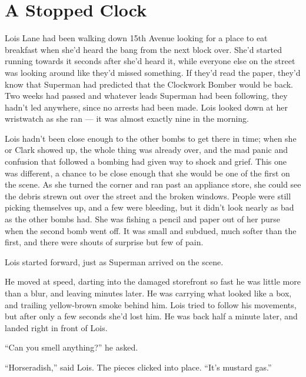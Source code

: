 \chapter{A Stopped Clock}\label{a-stopped-clock}

Lois Lane had been walking down 15th Avenue looking for a place to eat
breakfast when she'd heard the bang from the next block over. She'd
started running towards it seconds after she'd heard it, while everyone
else on the street was looking around like they'd missed something. If
they'd read the paper, they'd know that Superman had predicted that the
Clockwork Bomber would be back. Two weeks had passed and whatever leads
Superman had been following, they hadn't led anywhere, since no arrests
had been made. Lois looked down at her wristwatch as she ran --- it was
almost exactly nine in the morning.

Lois hadn't been close enough to the other bombs to get there in time;
when she or Clark showed up, the whole thing was already over, and the
mad panic and confusion that followed a bombing had given way to shock
and grief. This one was different, a chance to be close enough that she
would be one of the first on the scene. As she turned the corner and ran
past an appliance store, she could see the debris strewn out over the
street and the broken windows. People were still picking themselves up,
and a few were bleeding, but it didn't look nearly as bad as the other
bombs had. She was fishing a pencil and paper out of her purse when the
second bomb went off. It was small and subdued, much softer than the
first, and there were shouts of surprise but few of pain.

Lois started forward, just as Superman arrived on the scene.

He moved at speed, darting into the damaged storefront so fast he was
little more than a blur, and leaving minutes later. He was carrying what
looked like a box, and trailing yellow‐brown smoke behind him. Lois
tried to follow his movements, but after only a few seconds she'd lost
him. He was back half a minute later, and landed right in front of Lois.

``Can you smell anything?'' he asked.

``Horseradish,'' said Lois. The pieces clicked into place. ``It's
mustard gas.''

